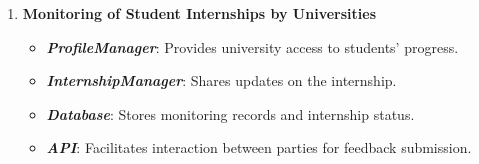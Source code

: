 \begin{enumerate}
        \item \textbf{Monitoring of Student Internships by Universities}
        \begin{itemize}
            \item \textit{\textbf{ProfileManager}}: Provides university access to students' progress.
            \item \textit{\textbf{InternshipManager}}: Shares updates on the internship.
            \item \textit{\textbf{Database}}: Stores monitoring records and internship status.
            \item \textit{\textbf{API}}: Facilitates interaction between parties for feedback submission.
        \end{itemize}
    \end{enumerate}


